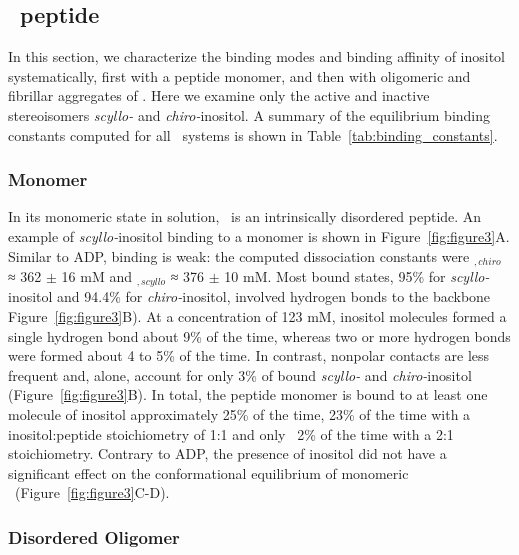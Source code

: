 \subsection{\gafour\ peptide}
In this section, we characterize the binding modes and binding affinity of inositol systematically, first with a peptide monomer, and then with oligomeric and fibrillar aggregates of \gafour. Here we examine only the active and inactive stereoisomers \textit{scyllo-} and \textit{chiro-}inositol. A summary of the equilibrium binding constants computed for all \gafour\ systems is shown in Table~\ref{tab:binding_constants}.

\subsubsection{Monomer}
In its monomeric state in solution, \gafour\ is an intrinsically disordered peptide.\cite{Nikolic:2011p57} An example of \textit{scyllo-}inositol binding to a monomer is shown in Figure~\ref{fig:figure3}A. Similar to ADP, binding is weak: the computed dissociation constants were \KD$_{,chiro}$ ≈ 362 $\pm$ 16 mM and \KD$_{,scyllo}$ ≈ 376 $\pm$ 10 mM. Most bound states, 95\% for \textit{scyllo-}inositol and 94.4\% for \textit{chiro-}inositol, involved hydrogen bonds to the backbone Figure~\ref{fig:figure3}B). At a concentration of 123 mM, inositol molecules formed a single hydrogen bond about 9\% of the time, whereas two or more hydrogen bonds were formed about 4 to 5\% of the time. In contrast, nonpolar contacts are less frequent and, alone, account for only 3\% of bound \textit{scyllo-} and \textit{chiro-}inositol (Figure~\ref{fig:figure3}B). In total, the peptide monomer is bound to at least one molecule of inositol approximately 25\% of the time, 23\% of the time with a inositol:peptide stoichiometry of 1:1 and only ~2\% of the time with a 2:1 stoichiometry. Contrary to ADP, the presence of inositol did not have a significant effect on the conformational equilibrium of monomeric \gafour\ (Figure~\ref{fig:figure3}C-D).

\subsubsection{Disordered Oligomer}

